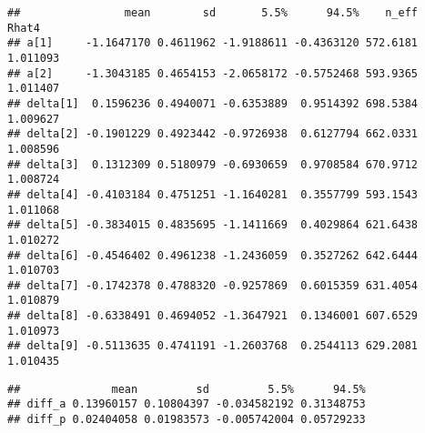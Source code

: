 \documentclass[]{article}
\newenvironment{Shaded}{\begin{snugshade}}{\end{snugshade}}
\newcommand{\KeywordTok}[1]{\textcolor[rgb]{0.13,0.29,0.53}{\textbf{{#1}}}}
\newcommand{\DataTypeTok}[1]{\textcolor[rgb]{0.13,0.29,0.53}{{#1}}}
\newcommand{\DecValTok}[1]{\textcolor[rgb]{0.00,0.00,0.81}{{#1}}}
\newcommand{\FloatTok}[1]{\textcolor[rgb]{0.00,0.00,0.81}{{#1}}}
\newcommand{\StringTok}[1]{\textcolor[rgb]{0.31,0.60,0.02}{{#1}}}
\newcommand{\OtherTok}[1]{\textcolor[rgb]{0.56,0.35,0.01}{{#1}}}
\newcommand{\NormalTok}[1]{{#1}}
\begin{document}
\begin{verbatim}
##                mean        sd       5.5%      94.5%    n_eff    Rhat4
## a[1]     -1.1647170 0.4611962 -1.9188611 -0.4363120 572.6181 1.011093
## a[2]     -1.3043185 0.4654153 -2.0658172 -0.5752468 593.9365 1.011407
## delta[1]  0.1596236 0.4940071 -0.6353889  0.9514392 698.5384 1.009627
## delta[2] -0.1901229 0.4923442 -0.9726938  0.6127794 662.0331 1.008596
## delta[3]  0.1312309 0.5180979 -0.6930659  0.9708584 670.9712 1.008724
## delta[4] -0.4103184 0.4751251 -1.1640281  0.3557799 593.1543 1.011068
## delta[5] -0.3834015 0.4835695 -1.1411669  0.4029864 621.6438 1.010272
## delta[6] -0.4546402 0.4961238 -1.2436059  0.3527262 642.6444 1.010703
## delta[7] -0.1742378 0.4788320 -0.9257869  0.6015359 631.4054 1.010879
## delta[8] -0.6338491 0.4694052 -1.3647921  0.1346001 607.6529 1.010973
## delta[9] -0.5113635 0.4741191 -1.2603768  0.2544113 629.2081 1.010435
\end{verbatim}

\begin{Shaded}
\end{Shaded}

\begin{verbatim}
##              mean         sd         5.5%      94.5%
## diff_a 0.13960157 0.10804397 -0.034582192 0.31348753
## diff_p 0.02404058 0.01983573 -0.005742004 0.05729233
\end{verbatim}

\begin{Shaded}
\end{Shaded}
\end{document}
